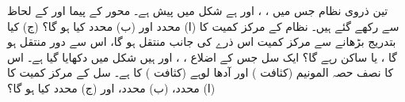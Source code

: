 تین ذروی نظام جس میں ، ، اور  ہے شکل  میں پیش ہے۔ محور کے  پیما  اور کے لحاظ سے رکھے گئے ہیں۔ نظام کے مرکز کمیت کا (ا)  محدد اور (ب)  محدد کیا ہو گا؟ (ج)  کیا  بتدریج بڑھانے سے مرکز کمیت  اس ذرے کی جانب منتقل ہو گا، اس سے دور منتقل ہو گا ، یا ساکن رہے گا؟
ایک سل جس  کے اضلاع ، ، اور  ہیں شکل  میں دکھایا گیا ہے۔ اس کا نصف حصہ  المونیم    (کثافت  ) اور آدھا لوہے (کثافت ) کا  ہے۔  سل کے مرکز کمیت کا (ا)  محدد، (ب)  محدد، اور (ج)  محدد کیا ہو گا؟

